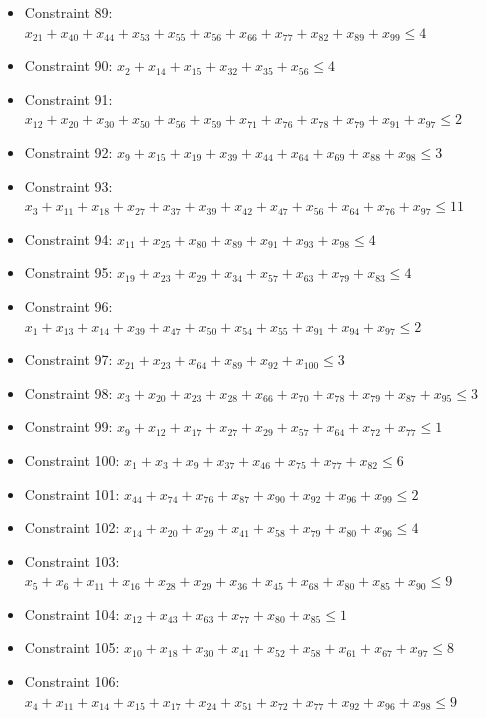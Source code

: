 \documentclass[11pt]{article}
\begin{document}
\begin{itemize}
\item Constraint 89: $x_{21} + x_{40} + x_{44} + x_{53} + x_{55} + x_{56} + x_{66} + x_{77} + x_{82} + x_{89} + x_{99} \le 4$
\item Constraint 90: $x_{2} + x_{14} + x_{15} + x_{32} + x_{35} + x_{56} \le 4$
\item Constraint 91: $x_{12} + x_{20} + x_{30} + x_{50} + x_{56} + x_{59} + x_{71} + x_{76} + x_{78} + x_{79} + x_{91} + x_{97} \le 2$
\item Constraint 92: $x_{9} + x_{15} + x_{19} + x_{39} + x_{44} + x_{64} + x_{69} + x_{88} + x_{98} \le 3$
\item Constraint 93: $x_{3} + x_{11} + x_{18} + x_{27} + x_{37} + x_{39} + x_{42} + x_{47} + x_{56} + x_{64} + x_{76} + x_{97} \le 11$
\item Constraint 94: $x_{11} + x_{25} + x_{80} + x_{89} + x_{91} + x_{93} + x_{98} \le 4$
\item Constraint 95: $x_{19} + x_{23} + x_{29} + x_{34} + x_{57} + x_{63} + x_{79} + x_{83} \le 4$
\item Constraint 96: $x_{1} + x_{13} + x_{14} + x_{39} + x_{47} + x_{50} + x_{54} + x_{55} + x_{91} + x_{94} + x_{97} \le 2$
\item Constraint 97: $x_{21} + x_{23} + x_{64} + x_{89} + x_{92} + x_{100} \le 3$
\item Constraint 98: $x_{3} + x_{20} + x_{23} + x_{28} + x_{66} + x_{70} + x_{78} + x_{79} + x_{87} + x_{95} \le 3$
\item Constraint 99: $x_{9} + x_{12} + x_{17} + x_{27} + x_{29} + x_{57} + x_{64} + x_{72} + x_{77} \le 1$
\item Constraint 100: $x_{1} + x_{3} + x_{9} + x_{37} + x_{46} + x_{75} + x_{77} + x_{82} \le 6$
\item Constraint 101: $x_{44} + x_{74} + x_{76} + x_{87} + x_{90} + x_{92} + x_{96} + x_{99} \le 2$
\item Constraint 102: $x_{14} + x_{20} + x_{29} + x_{41} + x_{58} + x_{79} + x_{80} + x_{96} \le 4$
\item Constraint 103: $x_{5} + x_{6} + x_{11} + x_{16} + x_{28} + x_{29} + x_{36} + x_{45} + x_{68} + x_{80} + x_{85} + x_{90} \le 9$
\item Constraint 104: $x_{12} + x_{43} + x_{63} + x_{77} + x_{80} + x_{85} \le 1$
\item Constraint 105: $x_{10} + x_{18} + x_{30} + x_{41} + x_{52} + x_{58} + x_{61} + x_{67} + x_{97} \le 8$
\item Constraint 106: $x_{4} + x_{11} + x_{14} + x_{15} + x_{17} + x_{24} + x_{51} + x_{72} + x_{77} + x_{92} + x_{96} + x_{98} \le 9$

\end{itemize}
\end{document}

